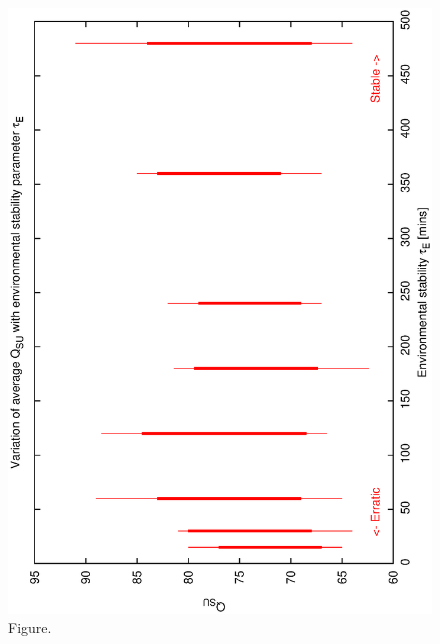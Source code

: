 \documentclass[12pt,a4paper]{article}
\begin{document}
\begin{figure}[htbp]
 \begin{center}
  \includegraphics[scale=1.0, angle=0]{figures/best_de.eps}
 \end{center}
  \caption[Figure.]
{Figure.}
\end{figure}
\clearpage
\end{document}
